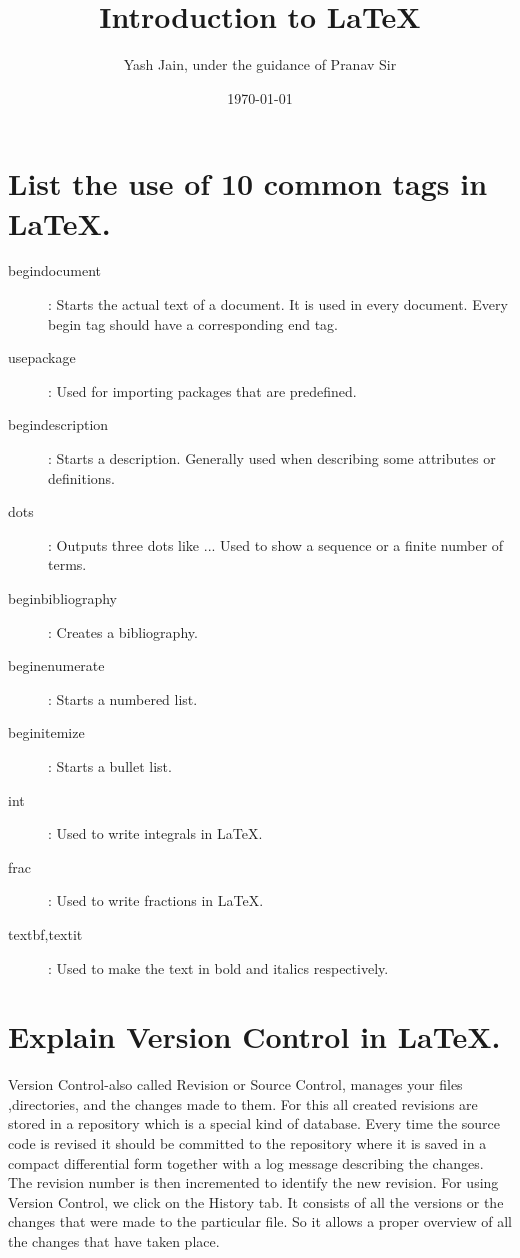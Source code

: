 \documentclass[a4paper]{article}
\title{Introduction to LaTeX }
\author{Yash Jain, under the guidance of Pranav Sir}
\date{\today}
\begin{document}
\maketitle
\newpage
\tableofcontents
\newpage

\section{List the use of 10 common tags in LaTeX.}
\label{sec:introduction}

\begin{description}
\item[begin{document}]: Starts the actual text of a document. It is used in every document. Every begin tag should have a corresponding end tag.
\item[usepackage]: Used for importing packages that are predefined.
\item[begin{description}]: Starts a description. Generally used when describing some attributes or definitions.
\item[dots]: Outputs three dots like ... Used to show a sequence or a finite number of terms.
\item[begin{bibliography}]: Creates a bibliography.
\item[begin{enumerate}]: Starts a numbered list.
\item[begin{itemize}]: Starts a bullet list. 
\item[int]: Used to write integrals in LaTeX.
\item[frac]: Used to write fractions in LaTeX.
\item[textbf,textit]: Used to make the text in bold and italics respectively.
\end{description}

\section{Explain Version Control in LaTeX.}
\label{sec:theory}
Version Control-also called Revision or Source Control, manages your ﬁles ,directories, and the changes made to them. For this all created revisions are stored in a repository which is a special kind of database. Every time the source code is revised it should be committed to the repository where it is saved in a compact differential form together with a log message describing the changes. The revision number is then incremented to identify the new revision.
For using Version Control, we click on the History tab. It consists of all the versions or the changes that were made to the particular file. So it allows a proper overview of all the changes that have taken place.
\end{document}
